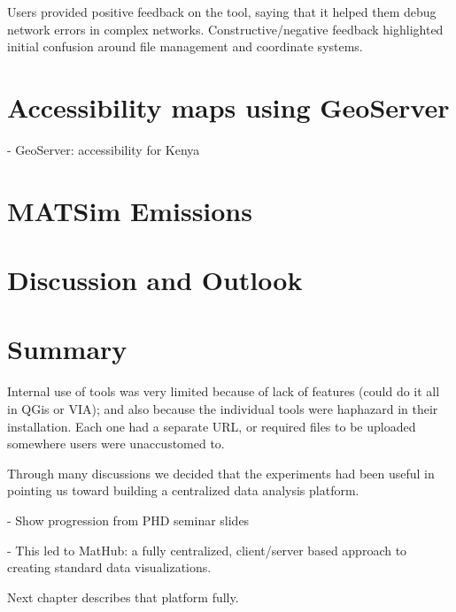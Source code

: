 Users provided positive feedback on the tool, saying that it helped them debug network errors in complex networks. Constructive/negative feedback highlighted initial confusion around file management and coordinate systems.


\hypertarget{server-experiments-geoserver}{%
\section{Accessibility maps using GeoServer}\label{server-experiments-geoserver}}

- GeoServer: accessibility for Kenya

\hypertarget{server-experiments-emissions}{%
\section{MATSim Emissions}\label{server-experiments-emissions}}

\hypertarget{server-experiments-findings}{%
\section{Discussion and Outlook}\label{server-experiments-findings}}

\hypertarget{server-experiments-summary}{%
\section{Summary}\label{server-experiments-summary}}


Internal use of tools was very limited because of lack of features (could do it all in QGis or VIA); and also because the individual tools were haphazard in their installation. Each one had a separate URL, or required files to be uploaded somewhere users were unaccustomed to.

Through many discussions we decided that the experiments had been useful in pointing us toward building a centralized data analysis platform.

- Show progression from PHD seminar slides

- This led to MatHub: a fully centralized, client/server based approach to creating standard data visualizations.

Next chapter describes that platform fully.


